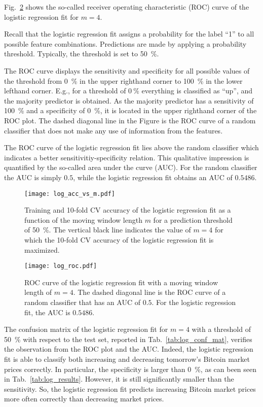 Fig.~\ref{fig:log_roc} shows the so-called receiver operating characteristic (ROC) curve of the logistic regression fit for $m=4$.

Recall that the logistic regression fit assigns a probability for the label \enquote{1} to all possible feature combinations. Predictions are made by applying a probability threshold. Typically, the threshold is set to \SI{50}{\percent}. 

The ROC curve displays the sensitivity and specificity for all possible values of the threshold from \SI{0}{\percent} in the upper righthand corner to \SI{100}{\percent} in the lower lefthand corner. E.g., for a threshold of $\SI{0}{\percent}$ everything is classified as \enquote{up}, and the majority predictor is obtained. As the majority predictor has a sensitivity of \SI{100}{\percent} and a specificity of \SI{0}{\percent}, it is located in the upper righthand corner of the ROC plot. The dashed diagonal line in the Figure is the ROC curve of a random classifier that does not make any use of information from the features. 

The ROC curve of the logistic regression fit lies above the random classifier which indicates a better sensitivitiy-specificity relation. This qualitative impression is quantified by the so-called area under the curve (AUC). For the random classifier the AUC is simply $0.5$, while the logistic regression fit obtains an AUC of $0.5486$.

\begin{figure}[h!]
  \centering
  \texttt{[image: log\_acc\_vs\_m.pdf]}
  \caption{Training and 10-fold CV accuracy of the logistic regression fit as a function of the moving window length $m$ for a prediction threshold of \SI{50}{\percent}. The vertical black line indicates the value of $m=4$ for which the 10-fold CV accuracy of the logistic regression fit is maximized.}
  \label{fig:log_acc_vs_m}
\end{figure}

\begin{figure}[h!]
  \centering
  \texttt{[image: log\_roc.pdf]}
  \caption{ROC curve of the logistic regression fit with a moving window length of $m=4$. The dashed diagonal line is the ROC curve of a random classifier that has an AUC of $0.5$. For the logistic regression fit, the AUC is $0.5486$.}
  \label{fig:log_roc}
\end{figure}

The confusion matrix of the logistic regression fit for $m=4$ with a threshold of \SI{50}{\percent} with respect to the test set, reported in Tab.~\ref{tab:log_conf_mat}, verifies the observation from the ROC plot and the AUC. Indeed, the logistic regression fit is able to classify both increasing and decreasing tomorrow's Bitcoin market prices correctly. In particular, the specificity is larger than \SI{0}{\percent}, as can been seen in Tab.~\ref{tab:log_results}. However, it is still significantly smaller than the sensitivity. So, the logistic regression fit predicts increasing Bitcoin market prices more often correctly than decreasing market prices.


